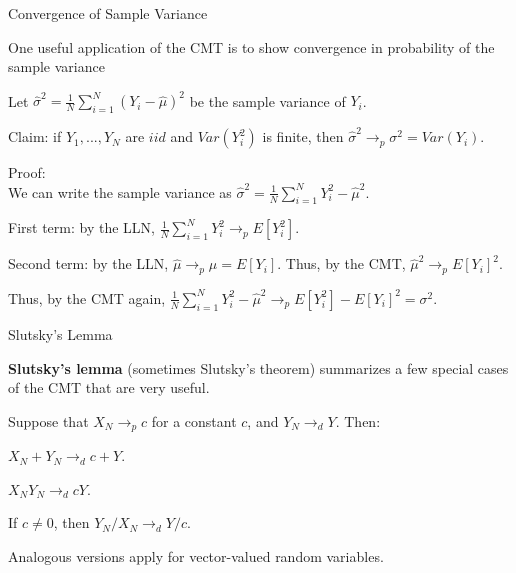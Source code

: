 \documentclass[11pt,english,handout]{beamer}
\newenvironment{wideitemize}{\itemize\addtolength{\itemsep}{10pt}}{\enditemize}
\begin{document}
\begin{frame}{Convergence of Sample Variance}
\begin{wideitemize}
\item
One useful application of the CMT is to show convergence in probability of the sample variance

\pause
\item
Let $\hat\sigma^2 = \frac{1}{N} \sum_{i=1}^N (Y_i - \hat\mu)^2$ be the sample variance of $Y_i$.

\pause
\item
Claim: if $Y_1,...,Y_N$ are $iid$ and $Var(Y_i^2)$ is finite, then $\hat\sigma^2 \rightarrow_p \sigma^2 = Var(Y_i)$. 

\pause
\item
Proof: \\

We can write the sample variance as $\hat\sigma^2 = \frac{1}{N} \sum_{i=1}^N Y_i^2 - \hat\mu^2$. \\ \vspace{.1cm} \pause

First term: by the LLN, $ \frac{1}{N} \sum_{i=1}^N Y_i^2 \rightarrow_p E[Y_i^2]$. \\ \vspace{.1cm} \pause

Second term: by the LLN, $\hat\mu \rightarrow_p \mu = E[Y_i]$. Thus, by the CMT, $\hat\mu^2 \rightarrow_p E[Y_i]^2$.\\ \vspace{.1cm} \pause

Thus, by the CMT again, $\frac{1}{N} \sum_{i=1}^N Y_i^2 - \hat\mu^2 \rightarrow_p E[Y_i^2] - E[Y_i]^2 = \sigma^2$. 

\end{wideitemize}		
\end{frame}

\begin{frame}{Slutsky's Lemma}

\begin{wideitemize}

\item
\textbf{Slutsky's lemma} (sometimes Slutsky's theorem) summarizes a few special cases of the CMT that are very useful. 

\pause
\item
Suppose that $X_N \rightarrow_p c$ for a constant $c$, and $Y_N \rightarrow_d Y$. Then: 

\item
$X_N + Y_N \rightarrow_d c + Y$. \pause

\item
$X_N Y_N \rightarrow_d c Y$. \pause

\item
If $c \neq 0$, then $Y_N/ X_N \rightarrow_d Y /c$. 

\pause
\item
Analogous versions apply for vector-valued random variables.
\end{wideitemize}
	
\end{frame}
\end{document}
